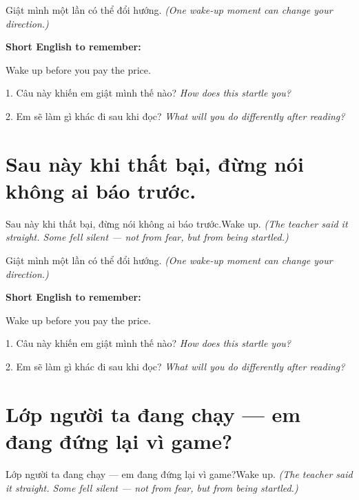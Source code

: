 \begin{baihoc}
Giật mình một lần có thể đổi hướng.
\textit{(One wake-up moment can change your direction.)}
\end{baihoc}

\begin{ghinhoanh}
\textbf{Short English to remember:}

Wake up before you pay the price.

\end{ghinhoanh}

\begin{tuhocnhanh}
1. Câu này khiến em giật mình thế nào? \textit{How does this startle you?}

2. Em sẽ làm gì khác đi sau khi đọc? \textit{What will you do differently after reading?}
\end{tuhocnhanh}
\ngancach


\section{Sau này khi thất bại, đừng nói không ai báo trước.}
\begin{truyen}{Sau này khi thất bại, đừng nói không ai báo trước.}{Wake up.}
\textit{(The teacher said it straight. Some fell silent — not from fear, but from being startled.)}
\end{truyen}

\begin{baihoc}
Giật mình một lần có thể đổi hướng.
\textit{(One wake-up moment can change your direction.)}
\end{baihoc}

\begin{ghinhoanh}
\textbf{Short English to remember:}

Wake up before you pay the price.

\end{ghinhoanh}

\begin{tuhocnhanh}
1. Câu này khiến em giật mình thế nào? \textit{How does this startle you?}

2. Em sẽ làm gì khác đi sau khi đọc? \textit{What will you do differently after reading?}
\end{tuhocnhanh}
\ngancach


\section{Lớp người ta đang chạy — em đang đứng lại vì game?}
\begin{truyen}{Lớp người ta đang chạy — em đang đứng lại vì game?}{Wake up.}
\textit{(The teacher said it straight. Some fell silent — not from fear, but from being startled.)}
\end{truyen}

